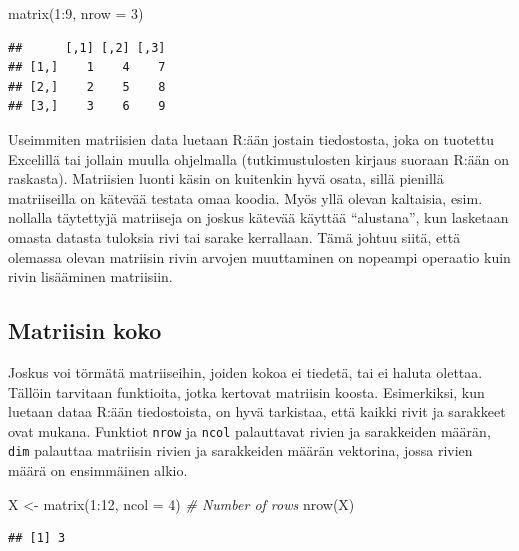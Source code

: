 \documentclass[
]{book}
\newenvironment{Shaded}{\begin{snugshade}}{\end{snugshade}}
\newcommand{\AttributeTok}[1]{\textcolor[rgb]{0.77,0.63,0.00}{#1}}
\newcommand{\CommentTok}[1]{\textcolor[rgb]{0.56,0.35,0.01}{\textit{#1}}}
\newcommand{\DecValTok}[1]{\textcolor[rgb]{0.00,0.00,0.81}{#1}}
\newcommand{\FunctionTok}[1]{\textcolor[rgb]{0.00,0.00,0.00}{#1}}
\newcommand{\NormalTok}[1]{#1}
\newcommand{\OtherTok}[1]{\textcolor[rgb]{0.56,0.35,0.01}{#1}}
\newcommand{\SpecialCharTok}[1]{\textcolor[rgb]{0.00,0.00,0.00}{#1}}
\begin{document}
\begin{Shaded}
\begin{Highlighting}[]
\FunctionTok{matrix}\NormalTok{(}\DecValTok{1}\SpecialCharTok{:}\DecValTok{9}\NormalTok{, }\AttributeTok{nrow =} \DecValTok{3}\NormalTok{)}
\end{Highlighting}
\end{Shaded}

\begin{verbatim}
##      [,1] [,2] [,3]
## [1,]    1    4    7
## [2,]    2    5    8
## [3,]    3    6    9
\end{verbatim}

Useimmiten matriisien data luetaan R:ään jostain tiedostosta, joka on tuotettu Excelillä tai jollain muulla ohjelmalla (tutkimustulosten kirjaus suoraan R:ään on raskasta). Matriisien luonti käsin on kuitenkin hyvä osata, sillä pienillä matriiseilla on kätevää testata omaa koodia. Myös yllä olevan kaltaisia, esim. nollalla täytettyjä matriiseja on joskus kätevää käyttää ``alustana'', kun lasketaan omasta datasta tuloksia rivi tai sarake kerrallaan. Tämä johtuu siitä, että olemassa olevan matriisin rivin arvojen muuttaminen on nopeampi operaatio kuin rivin lisääminen matriisiin.

\hypertarget{matriisin-koko}{%
\subsection{Matriisin koko}\label{matriisin-koko}}

Joskus voi törmätä matriiseihin, joiden kokoa ei tiedetä, tai ei haluta olettaa. Tällöin tarvitaan funktioita, jotka kertovat matriisin koosta. Esimerkiksi, kun luetaan dataa R:ään tiedostoista, on hyvä tarkistaa, että kaikki rivit ja sarakkeet ovat mukana. Funktiot \texttt{nrow} ja \texttt{ncol} palauttavat rivien ja sarakkeiden määrän, \texttt{dim} palauttaa matriisin rivien ja sarakkeiden määrän vektorina, jossa rivien määrä on ensimmäinen alkio.

\begin{Shaded}
\begin{Highlighting}[]
\NormalTok{X }\OtherTok{\textless{}{-}} \FunctionTok{matrix}\NormalTok{(}\DecValTok{1}\SpecialCharTok{:}\DecValTok{12}\NormalTok{, }\AttributeTok{ncol =} \DecValTok{4}\NormalTok{)}
\CommentTok{\# Number of rows}
\FunctionTok{nrow}\NormalTok{(X)}
\end{Highlighting}
\end{Shaded}

\begin{verbatim}
## [1] 3
\end{verbatim}
\end{document}
